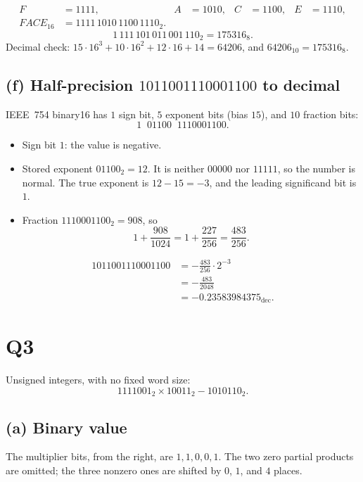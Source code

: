 \documentclass[11pt,a4paper]{article}
\begin{document}
\[
\begin{aligned}
F&=1111, & A&=1010, & C&=1100, & E&=1110, \\
FACE_{16}&=1111\,1010\,1100\,1110_{2}.
\end{aligned}
\]
\[
1\,111\,101\,011\,001\,110_{2}=175316_{8}.
\]
Decimal check: \(15\cdot16^{3}+10\cdot16^{2}+12\cdot16+14=64206\), and \(64206_{10}=175316_{8}\).

\subsection*{(f) Half-precision \(1011001110001100\) to decimal}

IEEE~754 binary16 has \(1\) sign bit, \(5\) exponent bits (bias \(15\)), and \(10\) fraction bits:
\[
1\;\;01100\;\;1110001100.
\]

\begin{itemize}
  \item Sign bit \(1\): the value is negative.
  \item Stored exponent \(01100_{2}=12\). It is neither \(00000\) nor \(11111\), so the number is normal.
        The true exponent is \(12-15=-3\), and the leading significand bit is \(1\).
  \item Fraction \(1110001100_{2}=908\), so
        \[
        1+\frac{908}{1024}
        =1+\frac{227}{256}
        =\frac{483}{256}.
        \]
\end{itemize}

\[
\begin{aligned}
1011001110001100
&= -\frac{483}{256}\cdot 2^{-3} \\
&= -\frac{483}{2048} \\
&= -0.23583984375_{\mathrm{dec}}.
\end{aligned}
\]

\section*{Q3}

Unsigned integers, with no fixed word size:
\[
1111001_{2}\times 10011_{2}-1010110_{2}.
\]

\subsection*{(a) Binary value}

The multiplier bits, from the right, are \(1,1,0,0,1\).
The two zero partial products are omitted; the three nonzero ones are shifted by \(0\), \(1\), and \(4\) places.
\end{document}

